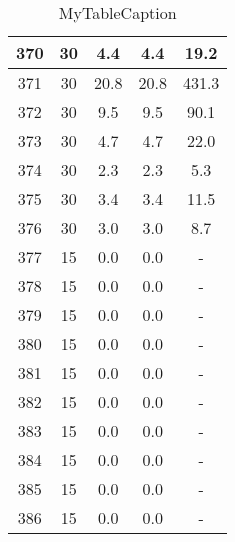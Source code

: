 \documentclass[a4paper,10pt]{article}
\begin{document}
\begin{table}
\begin{tabular}{|c|c|c|c|c|}
\hline
370 & 30 & 4.4 & 4.4 & 19.2 \\
\hline
371 & 30 & 20.8 & 20.8 & 431.3 \\
\hline
372 & 30 & 9.5 & 9.5 & 90.1 \\
\hline
373 & 30 & 4.7 & 4.7 & 22.0 \\
\hline
374 & 30 & 2.3 & 2.3 & 5.3 \\
\hline
375 & 30 & 3.4 & 3.4 & 11.5 \\
\hline
376 & 30 & 3.0 & 3.0 & 8.7 \\
\hline
377 & 15 & 0.0 & 0.0 & - \\
\hline
378 & 15 & 0.0 & 0.0 & - \\
\hline
379 & 15 & 0.0 & 0.0 & - \\
\hline
380 & 15 & 0.0 & 0.0 & - \\
\hline
381 & 15 & 0.0 & 0.0 & - \\
\hline
382 & 15 & 0.0 & 0.0 & - \\
\hline
383 & 15 & 0.0 & 0.0 & - \\
\hline
384 & 15 & 0.0 & 0.0 & - \\
\hline
385 & 15 & 0.0 & 0.0 & - \\
\hline
386 & 15 & 0.0 & 0.0 & - \\
\hline
\end{tabular}
\caption{MyTableCaption}
\label{table:MyTableLabel}
\end{table}
\end{document}
